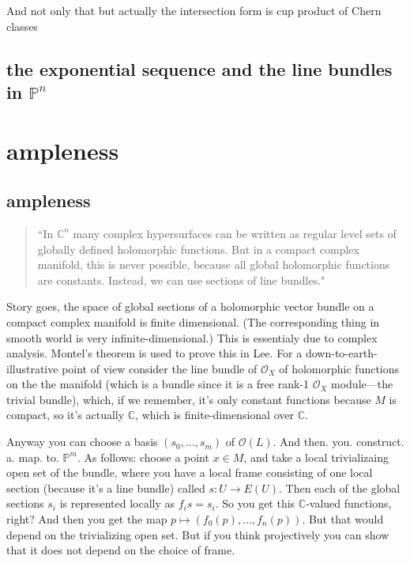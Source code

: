 And not only that but actually the intersection form is cup product of Chern classes

\subsection{the exponential sequence and the line bundles in \(\mathbb{P}^n\)}





\section{ampleness}
\subsection{ampleness}

\begin{quotation}
	``In \(\mathbb{C}^n\) many complex hypersurfaces can be written as regular level sets of globally defined holomorphic functions. But in a compact complex manifold, this is never possible, because all global holomorphic functions are constants. Instead, we can use sections of line bundles."
\end{quotation}

Story goes, the space of global sections of a holomorphic vector bundle on a compact complex manifold is finite dimensional. (The corresponding thing in smooth world is very infinite-dimensional.) This is essentialy due to complex analysis. Montel's theorem is used to prove this in Lee. For a down-to-earth-illustrative point of view consider the line bundle of \(\mathcal{O}_X\) of holomorphic functions on the the manifold (which is a bundle since it is a free rank-1 \(\mathcal{O}_X\) module---the trivial bundle), which, if we remember, it's only constant functions because \(M\) is compact, so it's actually \(\mathbb{C}\), which is finite-dimensional over \(\mathbb{C}\).

Anyway you can choose a basis \((s_0,\ldots,s_m)\) of \(\mathcal{O}(L)\). And then. you. construct. a. map. to. \(\mathbb{P}^m\). As follows: choose a point \(x \in M\), and take a local trivializaing open set of the bundle, where you have a local frame consisting of one local section (because it's a line bundle) called \(s: U \to E(U)\). Then each of the global sections \(s_i\) is represented locally as \(f_is=s_i\). So you get this \(\mathbb{C}\)-valued functions, right? And then you get the map \(p \mapsto (f_0(p),\ldots,f_n(p))\). But that would depend on the trivializing open set. But if you think projectively you can show that it does not depend on the choice of frame.

